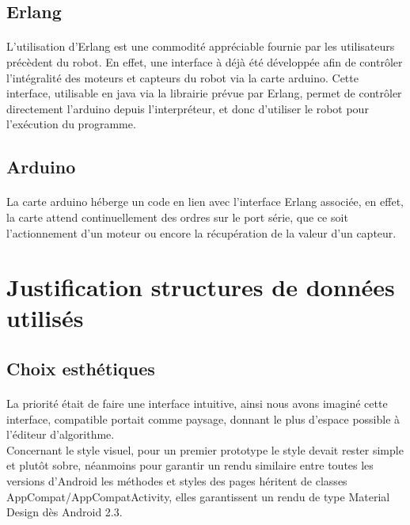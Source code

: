 \documentclass[a4paper]{article}
\begin{document}
\subsection{Erlang}
\paragraph{}
L’utilisation d’Erlang est une commodité appréciable fournie par les utilisateurs précèdent du robot. En effet, une interface à déjà été développée afin de contrôler l’intégralité des moteurs et capteurs du robot via la carte arduino. Cette interface, utilisable en java via la librairie prévue par Erlang, permet de contrôler directement l’arduino depuis l'interpréteur, et donc d’utiliser le robot pour l'exécution du programme.

\subsection{Arduino}
\paragraph{}
La carte arduino héberge un code en lien avec l’interface Erlang associée, en effet, la carte attend continuellement des ordres sur le port série, que ce soit l’actionnement d’un moteur ou encore la récupération de la valeur d’un capteur.

\section{Justification structures de données utilisés}
\subsection{Choix esthétiques}
\paragraph{}
La priorité était de faire une interface intuitive, ainsi nous avons imaginé cette interface, compatible portait comme paysage, donnant le plus d’espace possible à l’éditeur d’algorithme.\\
Concernant le style visuel, pour un premier prototype le style devait rester simple et plutôt sobre, néanmoins pour garantir un rendu similaire entre toutes les versions d’Android les méthodes et styles des pages héritent de classes AppCompat/AppCompatActivity, elles garantissent un rendu de type Material Design dès Android 2.3.
\end{document}
